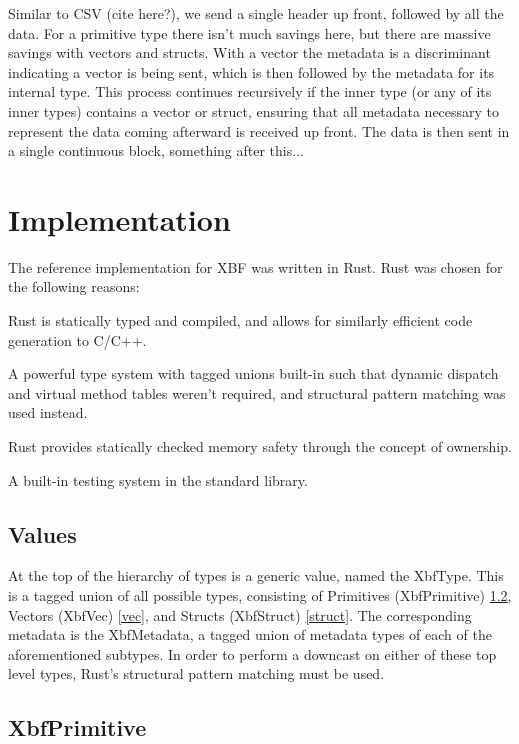 \documentclass[conference]{IEEEtran}
\begin{document}
Similar to CSV (cite here?), we send a single header up front, followed by all the data. For a primitive type there isn't much savings here, but there are massive savings with vectors and structs. With a vector the metadata is a discriminant indicating a vector is being sent, which is then followed by the metadata for its internal type. This process continues recursively if the inner type (or any of its inner types) contains a vector or struct, ensuring that all metadata necessary to represent the data coming afterward is received up front. The data is then sent in a single continuous block, something after this...

\section{Implementation}

The reference implementation for XBF\cite{xbf_impl} was written in Rust\cite{rust}. Rust was chosen for the following reasons:
\begin{IEEEitemize}
	\item Rust is statically typed and compiled, and allows for similarly efficient code generation to C/C++.
	\item A powerful type system with tagged unions built-in\cite{enums} such that dynamic dispatch and virtual method tables weren't required, and structural pattern matching was used instead.
	\item Rust provides statically checked memory safety through the concept of ownership\cite{ownership}.
	\item A built-in testing system in the standard library\cite{testing}.
\end{IEEEitemize}

\subsection{Values}

At the top of the hierarchy of types is a generic value, named the XbfType. This is a tagged union of all possible types, consisting of Primitives (XbfPrimitive) \ref{primitives}, Vectors (XbfVec)
\ref{vec}, and Structs (XbfStruct) \ref{struct}. The corresponding metadata is the XbfMetadata, a tagged union of metadata types of each of the aforementioned subtypes. In order to perform a downcast on either of these top level types, Rust's structural pattern matching must be used.

\subsection{XbfPrimitive}\label{primitives}
\end{document}
